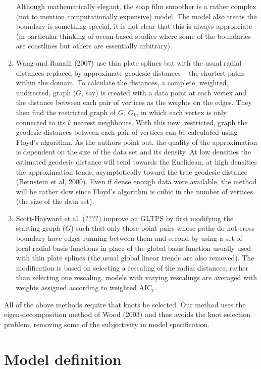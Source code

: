 \documentclass[useAMS, referee]{biom}
\begin{document}
\begin{enumerate}
Although mathematically elegant, the soap film smoother is a rather complex (not to mention computationally expensive) model. The model also treats the boundary is something special, it is not clear that this is always appropriate (in particular thinking of ocean-based studies where some of the boundaries are coastlines but others are essentially arbitrary).

\item Wang and Ranalli (2007) use thin plate splines but with the usual radial distances replaced by approximate geodesic distances -- the shortest paths within the domain. To calculate the distances, a complete, weighted, undirected, graph ($G$, say) is created with a data point at each vertex and the distance between each pair of vertices as the weights on the edges. They then find the restricted graph of $G$, $G_k$, in which each vertex is only connected to its $k$ nearest neighbours. With this new, restricted, graph the geodesic distances between each pair of vertices can be calculated using Floyd's algorithm. As the authors point out, the quality of the approximation is dependent on the size of the data set and its density. At low densities the estimated geodesic distance will tend towards the Euclidean, at high densities the approximation tends, asymptotically toward the true geodesic distance (Bernstein et al, 2000). Even if  dense enough data were available, the method will be rather slow since Floyd's algorithm is cubic in the number of vertices (the size of the data set). 

\item Scott-Hayward et al. (????) improve on GLTPS by first modifying the starting graph ($G$) such that only those point pairs whose paths do not cross boundary have edges running between them and second by using a set of local radial basis functions in place of the global basis function usually used with thin plate splines (the usual global linear trends are also removed). The modification is based on selecting a rescaling of the radial distances; rather than selecting one rescaling, models with varying rescalings are averaged with weights assigned according to weighted AIC$_\text{c}$.
\end{enumerate}


All of the above methods require that knots be selected. Our method uses the eigen-decomposition method of Wood (2003) and thus avoids the knot selection problem, removing some of the subjectivity in model specification.


\section{Model definition}
\label{proposed-model}
\end{document}
